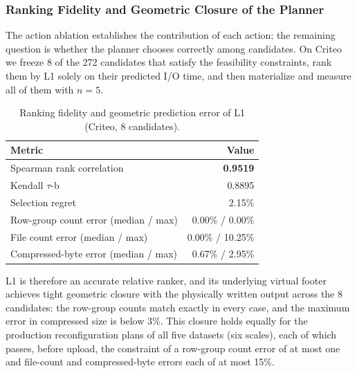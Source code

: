 \subsubsection{Ranking Fidelity and Geometric Closure of the Planner}
\label{subsec:fidelity}

The action ablation establishes the contribution of each action; the remaining
question is whether the planner chooses correctly among candidates. On Criteo we
freeze 8 of the 272 candidates that satisfy the feasibility constraints, rank
them by L1 solely on their predicted I/O time, and then materialize and measure
all of them with $n=5$.

\begin{table}[t]
\centering
\caption{Ranking fidelity and geometric prediction error of L1 (Criteo, 8
candidates).}
\label{tab:fidelity}
\footnotesize
\begin{tabular}{@{}lr@{}}
\toprule
Metric & Value \\
\midrule
Spearman rank correlation                         & \textbf{0.9519} \\
Kendall $\tau$-b                                  & 0.8895 \\
Selection regret                                  & 2.15\% \\
Row-group count error (median / max)              & 0.00\% / 0.00\% \\
File count error (median / max)                   & 0.00\% / 10.25\% \\
Compressed-byte error (median / max)              & 0.67\% / 2.95\% \\
\bottomrule
\end{tabular}
\end{table}

L1 is therefore an accurate relative ranker, and its underlying virtual footer
achieves tight geometric closure with the physically written output across the 8
candidates: the row-group counts match exactly in every case, and the maximum
error in compressed size is below 3\%. This closure holds equally for the
production reconfiguration plans of all five datasets (six scales), each of which
passes, before upload, the constraint of a row-group count error of at most one
and file-count and compressed-byte errors each of at most 15\%.
